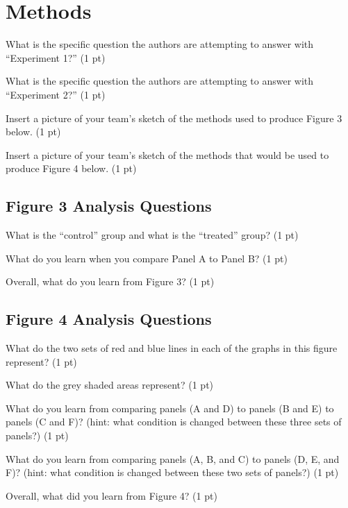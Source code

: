 \documentclass[12pt,a4paper]{article}
\begin{document}
\section*{Methods}
\begin{enumerate}[font=\bfseries, wide, resume]
    {\color{under}\item What is the specific question the authors are attempting to answer with “Experiment 1?” (1 pt)}
    
    
    {\color{under}\item What is the specific question the authors are attempting to answer with “Experiment 2?” (1 pt)}
    

    {\color{under}\item Insert a picture of your team’s sketch of the methods used to produce Figure 3 below. (1 pt)}
    

    {\color{under}\item Insert a picture of your team’s sketch of the methods that would be used to produce Figure 4 below. (1 pt)}
    
    \subsection*{Figure 3 Analysis Questions}
    {\color{under}\item What is the “control” group and what is the “treated” group? (1 pt)}
    
    
    {\color{under}\item What do you learn when you compare Panel A to Panel B? (1 pt)}


    {\color{under}\item Overall, what do you learn from Figure 3? (1 pt)}
    
    \subsection*{Figure 4 Analysis Questions}
    {\color{under}\item  What do the two sets of red and blue lines in each of the graphs in this figure represent? (1 pt)}
    
    
    {\color{under}\item What do the grey shaded areas represent? (1 pt)}
    
    
    {\color{under}\item What do you learn from comparing panels (A and D) to panels (B and E) to panels (C and F)? (hint: what condition is changed between these three sets of panels?) (1 pt)}


    {\color{under}\item What do you learn from comparing panels (A, B, and C) to panels (D, E, and F)? (hint: what condition is changed between these two sets of panels?) (1 pt)}
    
    
    {\color{under}\item  Overall, what did you learn from Figure 4? (1 pt)}
\end{enumerate}
    
\end{document}
